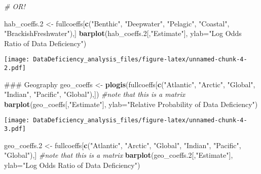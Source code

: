 \documentclass[]{article}
\newenvironment{Shaded}{\begin{snugshade}}{\end{snugshade}}
\newcommand{\KeywordTok}[1]{\textcolor[rgb]{0.13,0.29,0.53}{\textbf{#1}}}
\newcommand{\DataTypeTok}[1]{\textcolor[rgb]{0.13,0.29,0.53}{#1}}
\newcommand{\DecValTok}[1]{\textcolor[rgb]{0.00,0.00,0.81}{#1}}
\newcommand{\StringTok}[1]{\textcolor[rgb]{0.31,0.60,0.02}{#1}}
\newcommand{\CommentTok}[1]{\textcolor[rgb]{0.56,0.35,0.01}{\textit{#1}}}
\newcommand{\NormalTok}[1]{#1}
\begin{document}
\begin{Shaded}
\begin{Highlighting}[]
\CommentTok{# OR! }

\NormalTok{hab_coeffs.}\DecValTok{2}\NormalTok{ <-}\StringTok{ }\NormalTok{fullcoeffs[}\KeywordTok{c}\NormalTok{(}\StringTok{"Benthic"}\NormalTok{, }\StringTok{"Deepwater"}\NormalTok{, }\StringTok{"Pelagic"}\NormalTok{, }\StringTok{"Coastal"}\NormalTok{, }\StringTok{"BrackishFreshwater"}\NormalTok{),]}
\KeywordTok{barplot}\NormalTok{(hab_coeffs.}\DecValTok{2}\NormalTok{[,}\StringTok{"Estimate"}\NormalTok{], }\DataTypeTok{ylab=}\StringTok{"Log Odds Ratio of Data Deficiency"}\NormalTok{)}
\end{Highlighting}
\end{Shaded}

\texttt{[image: DataDeficiency\_analysis\_files/figure-latex/unnamed-chunk-4-2.pdf]}

\begin{Shaded}
\begin{Highlighting}[]
\NormalTok{### Geography}
\NormalTok{geo_coeffs <-}\StringTok{ }\KeywordTok{plogis}\NormalTok{(fullcoeffs[}\KeywordTok{c}\NormalTok{(}\StringTok{"Atlantic"}\NormalTok{, }\StringTok{"Arctic"}\NormalTok{, }\StringTok{"Global"}\NormalTok{, }\StringTok{"Indian"}\NormalTok{, }\StringTok{"Pacific"}\NormalTok{, }\StringTok{"Global"}\NormalTok{),]) }\CommentTok{#note that this is a matrix}
\KeywordTok{barplot}\NormalTok{(geo_coeffs[,}\StringTok{"Estimate"}\NormalTok{], }\DataTypeTok{ylab=}\StringTok{"Relative Probability of Data Deficiency"}\NormalTok{)}
\end{Highlighting}
\end{Shaded}

\texttt{[image: DataDeficiency\_analysis\_files/figure-latex/unnamed-chunk-4-3.pdf]}

\begin{Shaded}
\begin{Highlighting}[]
\NormalTok{geo_coeffs.}\DecValTok{2}\NormalTok{ <-}\StringTok{ }\NormalTok{fullcoeffs[}\KeywordTok{c}\NormalTok{(}\StringTok{"Atlantic"}\NormalTok{, }\StringTok{"Arctic"}\NormalTok{, }\StringTok{"Global"}\NormalTok{, }\StringTok{"Indian"}\NormalTok{, }\StringTok{"Pacific"}\NormalTok{, }\StringTok{"Global"}\NormalTok{),] }\CommentTok{#note that this is a matrix}
\KeywordTok{barplot}\NormalTok{(geo_coeffs.}\DecValTok{2}\NormalTok{[,}\StringTok{"Estimate"}\NormalTok{], }\DataTypeTok{ylab=}\StringTok{"Log Odds Ratio of Data Deficiency"}\NormalTok{)}
\end{Highlighting}
\end{Shaded}
\end{document}
